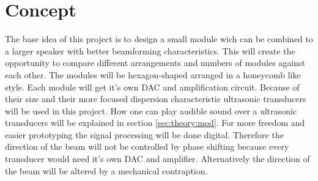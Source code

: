 \chapter{Concept}


The base idea of this project is to design a small module wich can be combined to a larger speaker with better beamforming characteristics. This will create the opportunity to compare different arrangements and numbers of modules against each other. The modules will be hexagon-shaped arranged in a honeycomb like style. Each module will get it's own DAC and amplification circuit.\p
Because of their size and their more focused dispersion characteristic ultrasonic transducers will be used in this project. How one can play audible sound over a ultrasonic transducers will be explained in section \ref{sec:theory:mod}.\p
For more freedom and easier prototyping the signal processing will be done digital. Therefore the direction of the beam will not be controlled by phase shifting because every transducer would need it's own DAC and amplifier. Alternatively the direction of the beam will be altered by a mechanical contraption.